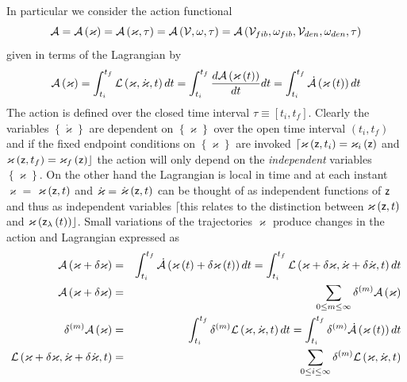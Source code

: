 In particular we consider the action functional 
\begin{equation}
{\cal A}={\cal A}\left( \varkappa \right) ={\cal A}\left( \varkappa ,\tau
\right) ={\cal A}\left( {\cal V},\omega ,\tau \right) ={\cal A}\left( {\cal V%
}_{fib},\omega _{fib},{\cal V}_{den},\omega _{den},\tau \right)
\end{equation}%
given in terms of the Lagrangian by 
\[
{\cal A}\left( \varkappa \right) =\int_{t_{i}}^{t_{f}}{\cal L}\left(
\varkappa ,\dot{\varkappa},t\right) dt=\int_{t_{i}}^{t_{f}}\frac{d{\cal A}%
\left( \varkappa \left( t\right) \right) }{dt}dt=\int_{t_{i}}^{t_{f}}{\cal 
\dot{A}}\left( \varkappa \left( t\right) \right) dt 
\]%
The action is defined over the closed time interval $\tau \equiv \left[
t_{i},t_{f}\right] $. Clearly the variables $\left\{ \dot{\varkappa}\right\} 
$ are dependent on $\left\{ \varkappa \right\} $ over the open time interval 
$\left( t_{i},t_{f}\right) $ and if the fixed endpoint conditions on $%
\left\{ \varkappa \right\} $ are invoked $\lceil \varkappa \left( {\sf z}%
,t_{i}\right) =\varkappa _{i}\left( {\sf z}\right) $ and $\varkappa \left( 
{\sf z},t_{f}\right) =\varkappa _{f}\left( {\sf z}\right) \rfloor $ the
action will only depend on the {\em independent }variables $\left\{
\varkappa \right\} $. On the other hand the Lagrangian is local in time and
at each instant $\varkappa =$ $\varkappa \left( {\sf z},t\right) $ and $\dot{%
\varkappa}=$ $\dot{\varkappa}\left( {\sf z},t\right) $ can be thought of as
independent functions of ${\sf z}$ and thus as independent variables $\lceil 
$this relates to the distinction between $\varkappa \left( {\sf z},t\right) $
and $\varkappa \left( {\sf z}_{\lambda }\left( t\right) \right) \rfloor $.
Small variations of the trajectories $\varkappa $ produce changes in the
action and Lagrangian expressed as 
\begin{eqnarray}
{\cal A}\left( \varkappa +\delta \varkappa \right) &=&\int_{t_{i}}^{t_{f}}%
{\cal \dot{A}}\left( \varkappa \left( t\right) +\delta \varkappa \left(
t\right) \right) dt=\int_{t_{i}}^{t_{f}}{\cal L}\left( \varkappa +\delta
\varkappa ,\dot{\varkappa}+\delta \dot{\varkappa},t\right) dt \\
{\cal A}\left( \varkappa +\delta \varkappa \right) &=&\sum_{0\leq m\leq
\infty }\delta ^{\left( m\right) }{\cal A}\left( \varkappa \right) \\
\delta ^{\left( m\right) }{\cal A}\left( \varkappa \right)
&=&\int_{t_{i}}^{t_{f}}\delta ^{\left( m\right) }{\cal L}\left( \varkappa ,%
\dot{\varkappa},t\right) dt=\int_{t_{i}}^{t_{f}}\delta ^{\left( m\right) }%
{\cal \dot{A}}\left( \varkappa \left( t\right) \right) dt \\
{\cal L}\left( \varkappa +\delta \varkappa ,\dot{\varkappa}+\delta \dot{%
\varkappa},t\right) &=&\sum_{0\leq i\leq \infty }\delta ^{\left( m\right) }%
{\cal L}\left( \varkappa ,\dot{\varkappa},t\right)
\end{eqnarray}%
